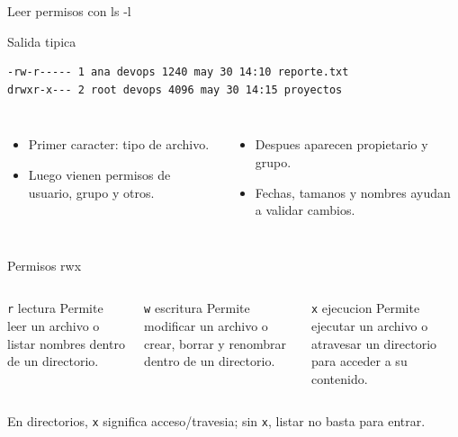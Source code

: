 \documentclass[aspectratio=169]{beamer}
\begin{document}
\begin{frame}[fragile]{Leer permisos con ls -l}
  \begin{exampleblock}{Salida tipica}
\begin{verbatim}
-rw-r----- 1 ana devops 1240 may 30 14:10 reporte.txt
drwxr-x--- 2 root devops 4096 may 30 14:15 proyectos
\end{verbatim}
  \end{exampleblock}
  \small
  \begin{columns}[t]
    \begin{itemize}
      \item Primer caracter: tipo de archivo.
      \item Luego vienen permisos de usuario, grupo y otros.
    \end{itemize}
    \begin{itemize}
      \item Despues aparecen propietario y grupo.
      \item Fechas, tamanos y nombres ayudan a validar cambios.
    \end{itemize}
  \end{columns}
\end{frame}

\begin{frame}{Permisos rwx}
  \small
  \begin{columns}[t]
    \begin{block}{\texttt{r} lectura}
      Permite leer un archivo o listar nombres dentro de un directorio.
    \end{block}
    \begin{exampleblock}{\texttt{w} escritura}
      Permite modificar un archivo o crear, borrar y renombrar dentro de un directorio.
    \end{exampleblock}
    \begin{alertblock}{\texttt{x} ejecucion}
      Permite ejecutar un archivo o atravesar un directorio para acceder a su contenido.
    \end{alertblock}
  \end{columns}
  \vfill
  \centering
  \small En directorios, \texttt{x} significa acceso/travesia; sin \texttt{x}, listar no basta para entrar.
\end{frame}
\end{document}
